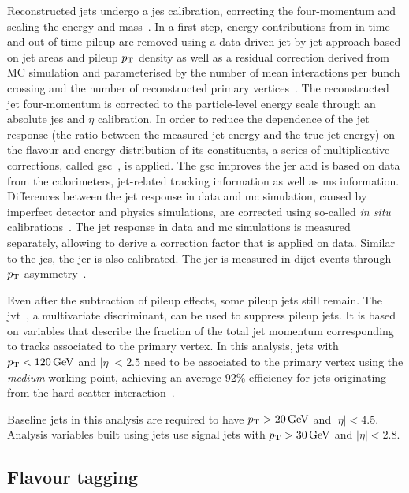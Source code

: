 Reconstructed jets undergo a \gls{jes} calibration, correcting the four-momentum and scaling the energy and mass~\cite{Aad:2020flx}. In a first step, energy contributions from in-time and out-of-time pileup are removed using a data-driven jet-by-jet approach based on jet areas and pileup $p_{\textrm{T}}$ density as well as a residual correction derived from MC simulation and parameterised by the number of mean interactions per bunch crossing and the number of reconstructed primary vertices~\cite{Aad:2020flx,Cacciari:2007fd}. The reconstructed jet four-momentum is corrected to the particle-level energy scale through an absolute \gls{jes} and $\eta$ calibration. In order to reduce the dependence of the jet response (\ie the ratio between the measured jet energy and the true jet energy) on the flavour and energy distribution of its constituents, a series of multiplicative corrections, called \gls{gsc}~\cite{PERF-2011-03}, is applied. The \gls{gsc} improves the \gls{jer} and is based on data from the calorimeters, jet-related tracking information as well as \gls{ms} information. Differences between the jet response in data and \gls{mc} simulation, caused by imperfect detector and physics simulations, are corrected using so-called \textit{in situ} calibrations~\cite{Aad:2020flx}. The jet response in data and \gls{mc} simulations is measured separately, allowing to derive a correction factor that is applied on data. Similar to the \gls{jes}, the \gls{jer} is also calibrated. The \gls{jer} is measured in dijet events through $p_{\textrm{T}}$ asymmetry~\cite{PERF-2014-02}.

Even after the subtraction of pileup effects, some pileup jets still remain. The \gls{jvt}~\cite{PERF-2014-03}, a multivariate discriminant, can be used to suppress pileup jets. It is based on variables that describe the fraction of the total jet momentum corresponding to tracks associated to the primary vertex. In this analysis, jets with $\pt < \SI{120}{\GeV}$ and $\vert\eta\vert < 2.5$ need to be associated to the primary vertex using the \textit{medium} working point, achieving an average 92\% efficiency for jets originating from the hard scatter interaction~\cite{Aad:2020flx}.

Baseline jets in this analysis are required to have $\pt > \SI{20}{\GeV}$ and $\vert\eta\vert < 4.5$. Analysis variables built using jets use signal jets with $\pt > \SI{30}{\GeV}$ and $\vert\eta\vert < 2.8$.

\subsection{Flavour tagging}

